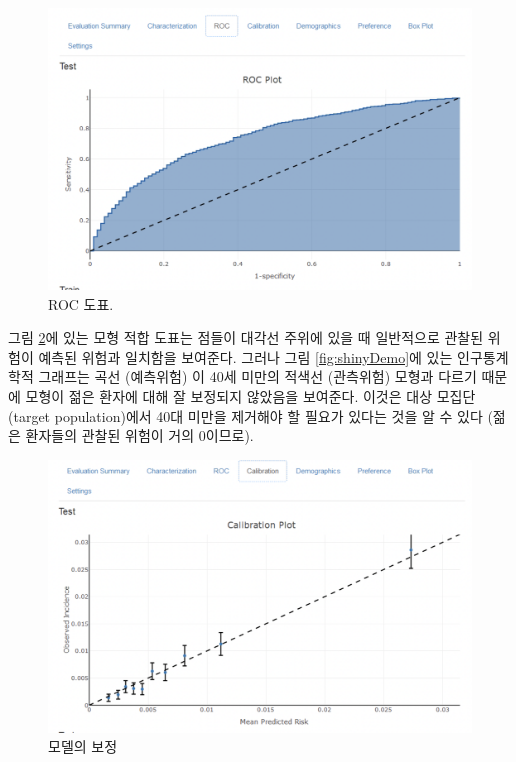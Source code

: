 \documentclass[11pt]{book}
\theoremstyle{definition}
\theoremstyle{definition}
\theoremstyle{definition}
\theoremstyle{remark}
\begin{document}
\begin{figure}

{\centering \includegraphics[width=1\linewidth]{images/PatientLevelPrediction/shiny/singleShiny/singleShinyRoc} 

}

\caption{ROC 도표.}\label{fig:shinyROC}
\end{figure}

그림 \ref{fig:shinyCal}에 있는 모형 적합 도표는 점들이 대각선 주위에
있을 때 일반적으로 관찰된 위험이 예측된 위험과 일치함을 보여준다. 그러나
그림 \ref{fig:shinyDemo}에 있는 인구통계학적 그래프는 곡선 (예측위험) 이
40세 미만의 적색선 (관측위험) 모형과 다르기 때문에 모형이 젊은 환자에
대해 잘 보정되지 않았음을 보여준다. 이것은 대상 모집단(target
population)에서 40대 미만을 제거해야 할 필요가 있다는 것을 알 수 있다
(젊은 환자들의 관찰된 위험이 거의 0이므로).

\begin{figure}

{\centering \includegraphics[width=1\linewidth]{images/PatientLevelPrediction/shiny/singleShiny/singleShinyCal} 

}

\caption{모델의 보정}\label{fig:shinyCal}
\end{figure}
\end{document}
